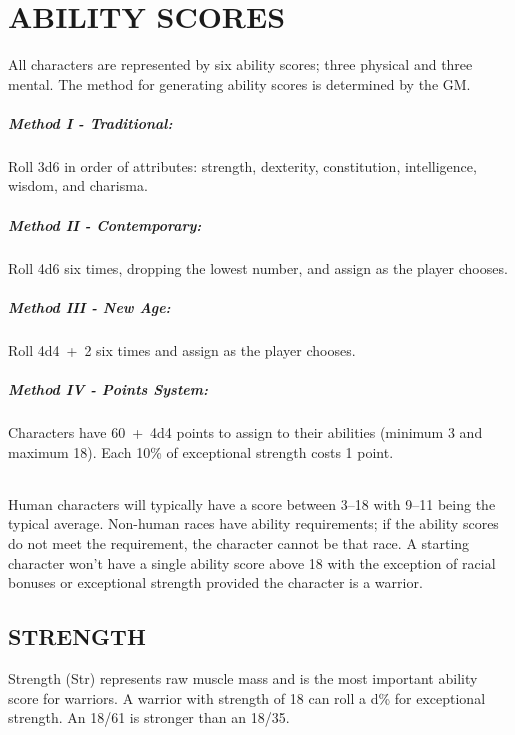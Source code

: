\chapter{ABILITY SCORES}

\begin{multicols}{2}

All characters are represented by six ability scores; three physical and three mental.  The method for generating ability scores is determined by the GM.  

\paragraph{Method I - Traditional:}  Roll 3d6 in order of attributes: strength, dexterity, constitution, intelligence, wisdom, and charisma.

\paragraph{Method II - Contemporary:}  Roll 4d6 six times, dropping the lowest number, and assign as the player chooses.

\paragraph{Method III - New Age:}  Roll 4d4~+~2 six times and assign as the player chooses.

\paragraph{Method IV - Points System:}  Characters have 60~+~4d4 points to assign to their abilities (minimum 3 and maximum 18).  Each 10\% of exceptional strength costs 1 point.

\subparagraph{}Human characters will typically have a score between 3--18 with 9--11 being the typical average.  Non-human races have ability requirements; if the ability scores do not meet the requirement, the character cannot be that race.  A starting character won't have a single ability score above 18 with the exception of racial bonuses or exceptional strength provided the character is a warrior.

\section{STRENGTH}

Strength (Str) represents raw muscle mass and is the most important ability score for warriors.  A warrior with strength of 18 can roll a d\% for exceptional strength.  An 18/61 is stronger than an 18/35.


\end{multicols}
